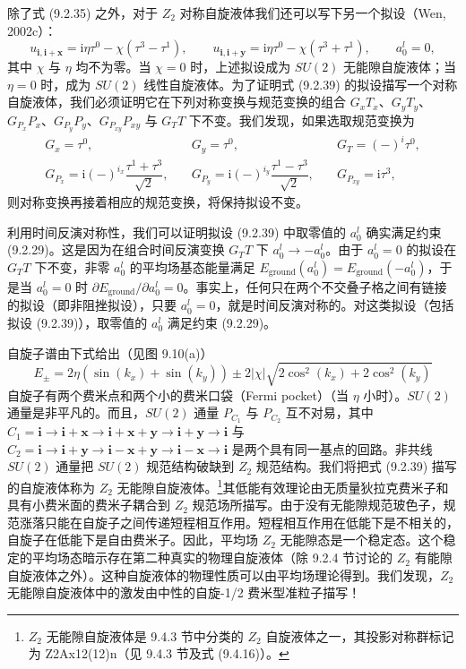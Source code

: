 除了式 (9.2.35) 之外，对于 $Z_2$ 对称自旋液体我们还可以写下另一个拟设（Wen, 2002c）：
\begin{equation*}
u_{\pmb{i},\pmb{i}+\pmb{x}}=\mathrm{i}\eta\tau^{0}-\chi(\tau^{3}-\tau^{1}),\qquad u_{\pmb{i},\pmb{i}+\pmb{y}}=\mathrm{i}\eta\tau^{0}-\chi(\tau^{3}+\tau^{1}),\qquad a_0^{l}=0,
\tag{9.2.39}
\end{equation*}
其中 $\chi$ 与 $\eta$ 均不为零。当 $\chi=0$ 时，上述拟设成为 $SU(2)$ 无能隙自旋液体；当 $\eta=0$ 时，成为 $SU(2)$ 线性自旋液体。为了证明式 (9.2.39) 的拟设描写一个对称自旋液体，我们必须证明它在下列对称变换与规范变换的组合 $G_xT_x$、$G_yT_y$、$G_{P_x}P_x$、$G_{P_y}P_y$、$G_{P_{xy}}P_{xy}$ 与 $G_TT$ 下不变。我们发现，如果选取规范变换为
\begin{equation*}
\begin{array}{lll}
G_x=\tau^{0}, & \quad G_y=\tau^{0}, & \quad G_T=(-)^{i}\tau^{0},\\[2pt]
G_{P_x}=\mathrm{i}(-)^{i_x}\dfrac{\tau^{1}+\tau^{3}}{\sqrt{2}}, & \quad G_{P_y}=\mathrm{i}(-)^{i_y}\dfrac{\tau^{1}-\tau^{3}}{\sqrt{2}}, & \quad G_{P_{xy}}=\mathrm{i}\tau^{3},
\end{array}
\tag{9.2.40}
\end{equation*}
则对称变换再接着相应的规范变换，将保持拟设不变。

利用时间反演对称性，我们可以证明拟设 (9.2.39) 中取零值的 $a_0^{l}$ 确实满足约束 (9.2.29)。这是因为在组合时间反演变换 $G_TT$ 下 $a_0^{l}\to-a_0^{l}$。由于 $a_0^{l}=0$ 的拟设在 $G_TT$ 下不变，非零 $a_0^{l}$ 的平均场基态能量满足 $E_{\mathrm{ground}}(a_0^{l})=E_{\mathrm{ground}}(-a_0^{l})$，于是当 $a_0^{l}=0$ 时 $\partial E_{\mathrm{ground}}/\partial a_0^{l}=0$。事实上，任何只在两个不交叠子格之间有链接的拟设（即非阻挫拟设），只要 $a_0^{l}=0$，就是时间反演对称的。对这类拟设（包括拟设 (9.2.39)），取零值的 $a_0^{l}$ 满足约束 (9.2.29)。

自旋子谱由下式给出（见图 9.10(a)）
\begin{equation*}
E_{\pm}=2\eta(\sin(k_x)+\sin(k_y))\pm 2|\chi|\sqrt{2\cos^{2}(k_x)+2\cos^{2}(k_y)}
\end{equation*}
自旋子有两个费米点和两个小的费米口袋（Fermi pocket）（当 $\eta$ 小时）。$SU(2)$ 通量是非平凡的。而且，$SU(2)$ 通量 $P_{C_1}$ 与 $P_{C_2}$ 互不对易，其中 $C_1=\pmb{i}\to\pmb{i}+\pmb{x}\to\pmb{i}+\pmb{x}+\pmb{y}\to\pmb{i}+\pmb{y}\to\pmb{i}$ 与 $C_2=\pmb{i}\to\pmb{i}+\pmb{y}\to\pmb{i}-\pmb{x}+\pmb{y}\to\pmb{i}-\pmb{x}\to\pmb{i}$ 是两个具有同一基点的回路。非共线 $SU(2)$ 通量把 $SU(2)$ 规范结构破缺到 $Z_2$ 规范结构。我们将把式 (9.2.39) 描写的自旋液体称为 $Z_2$ 无能隙自旋液体。\footnote{$Z_2$ 无能隙自旋液体是 9.4.3 节中分类的 $Z_2$ 自旋液体之一，其投影对称群标记为 Z2Ax12(12)n（见 9.4.3 节及式 (9.4.16)）。}其低能有效理论由无质量狄拉克费米子和具有小费米面的费米子耦合到 $Z_2$ 规范场所描写。由于没有无能隙规范玻色子，规范涨落只能在自旋子之间传递短程相互作用。短程相互作用在低能下是不相关的，自旋子在低能下是自由费米子。因此，平均场 $Z_2$ 无能隙态是一个稳定态。这个稳定的平均场态暗示存在第二种真实的物理自旋液体（除 9.2.4 节讨论的 $Z_2$ 有能隙自旋液体之外）。这种自旋液体的物理性质可以由平均场理论得到。我们发现，$Z_2$ 无能隙自旋液体中的激发由中性的自旋-1/2 费米型准粒子描写！

